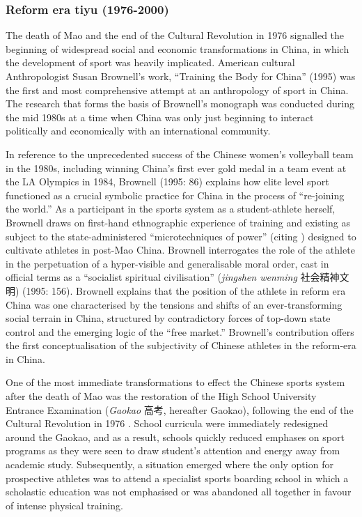 \begin{CJK}{UTF8}{gbsn}
\subsubsection{Reform era tiyu (1976-2000)\label{sect:reformEra}}
The death of Mao and the end of the Cultural Revolution in 1976 signalled the beginning of widespread social and economic transformations in China, in which the development of sport was heavily implicated.  American cultural Anthropologist Susan Brownell’s work, ``Training the Body for China'' (1995) was the first and most comprehensive attempt at an anthropology of sport in China. The research that forms the basis of Brownell's monograph was conducted during the mid 1980s at a time when China was only just beginning to interact politically and economically with an international community.

In reference to the unprecedented success of the Chinese women’s volleyball team in the 1980s, including winning China's first ever gold medal in a team event at the LA Olympics in 1984, Brownell (1995: 86) explains how elite level sport functioned as a crucial symbolic practice for China in the process of ``re-joining the world.''  As a participant in the sports system as a student-athlete herself, Brownell draws on first-hand ethnographic experience of training and existing as subject to the state-administered ``microtechniques of power'' (citing \cite{Foucault1977}) designed to cultivate athletes in post-Mao China.  Brownell interrogates the role of the athlete in the perpetuation of a hyper-visible and generalisable moral order, cast in official terms as a ``socialist spiritual civilisation'' (\textit{jingshen wenming} 社会精神文明) (1995: 156).  Brownell explains that the position of the athlete in reform era China was one characterised by the tensions and shifts of an ever-transforming social terrain in China,  structured by contradictory forces of top-down state control and the emerging logic of the ``free market.''
Brownell's contribution offers the first conceptualisation of the subjectivity of Chinese athletes in the reform-era in China.

One of the most immediate transformations to effect the Chinese sports system after the death of Mao was the restoration of the High School University Entrance Examination (\textit{Gaokao} 高考, hereafter Gaokao), following the end of the Cultural Revolution in 1976 \citep[198]{Brownell1995}.  School curricula were immediately redesigned around the Gaokao, and as a result, schools quickly reduced emphases on sport programs as they were seen to draw student’s attention and energy away from academic study.  Subsequently, a situation emerged where the only option for prospective athletes was to attend a specialist sports boarding school in which a scholastic education was not emphasised or was abandoned all together in favour of intense physical training.


\end{CJK}
